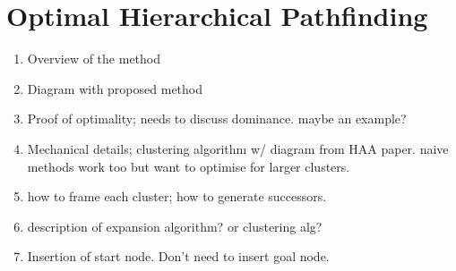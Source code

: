 \section{Optimal Hierarchical Pathfinding}
\begin{enumerate}
  \item{Overview of the method}
  \item{Diagram with proposed method}
  \item{Proof of optimality; needs to discuss dominance. maybe an example?}
  \item{Mechanical details; clustering algorithm w/ diagram from HAA paper.
    naive methods work too but want to optimise for larger clusters}.
  \item{how to frame each cluster; how to generate successors}.
  \item{description of expansion algorithm? or clustering alg?}
  \item{Insertion of start node. Don't need to insert goal node. }
\end{enumerate}
 
